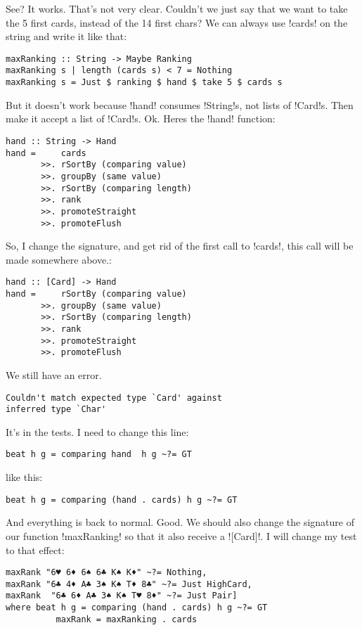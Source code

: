 \success See? It works.
\lhN That's not very clear. Couldn't we just say that we want to take the 5 first cards, instead of the 14 first chars?
\lhA We can always use \il!cards! on the string and write it like that:
\begin{lstlisting}[frame=single]
maxRanking :: String -> Maybe Ranking
maxRanking s | length (cards s) < 7 = Nothing
maxRanking s = Just $ ranking $ hand $ take 5 $ cards s
\end{lstlisting}
\error But it doesn't work because \il!hand! consumes \il!String!s, not lists of \il!Card!s.
\lhN Then make it accept a list of \il!Card!s.
\lhA \error Ok. Heres the \il!hand! function:
\begin{lstlisting}[frame=single]
hand :: String -> Hand
hand =     cards
       >>. rSortBy (comparing value)
       >>. groupBy (same value)
       >>. rSortBy (comparing length)
       >>. rank
       >>. promoteStraight
       >>. promoteFlush    
\end{lstlisting}
\error So, I change the signature, and get rid of the first call to \il!cards!, this call will be made somewhere above.:
\begin{lstlisting}[frame=single]
hand :: [Card] -> Hand
hand =     rSortBy (comparing value)
       >>. groupBy (same value)
       >>. rSortBy (comparing length)
       >>. rank
       >>. promoteStraight
       >>. promoteFlush    
\end{lstlisting}         
\error We still have an error.
\lhN
\begin{small}
\begin{verbatim} 
Couldn't match expected type `Card' against 
inferred type `Char'
\end{verbatim}
\end{small}
It's in the tests. I need to change this line:
\begin{lstlisting}[frame=single]
beat h g = comparing hand  h g ~?= GT
\end{lstlisting}
like this:
\begin{lstlisting}[frame=single]
beat h g = comparing (hand . cards) h g ~?= GT
\end{lstlisting}
\success And everything is back to normal.
\lhA Good.
\lhN We should also change the signature of our function \il!maxRanking! so that it also receive a \il![Card]!.
I will change my test to that effect:
\begin{lstlisting}[frame=single]
maxRank "6♥ 6♦ 6♠ 6♣ K♠ K♦" ~?= Nothing,
maxRank "6♣ 4♦ A♣ 3♠ K♠ T♦ 8♣" ~?= Just HighCard,
maxRank  "6♣ 6♦ A♣ 3♠ K♠ T♥ 8♦" ~?= Just Pair]
where beat h g = comparing (hand . cards) h g ~?= GT
          maxRank = maxRanking . cards 
\end{lstlisting}
